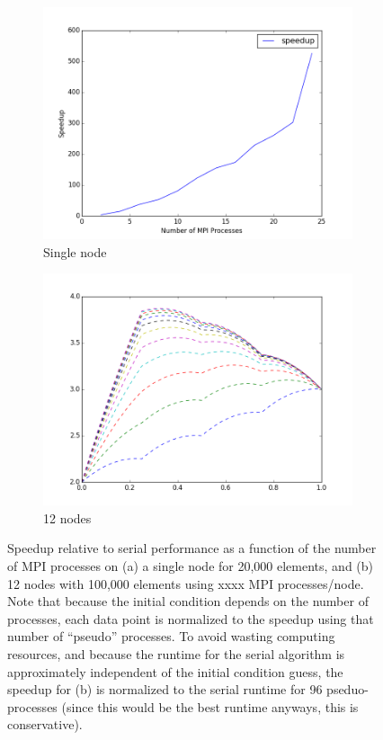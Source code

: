 \documentclass[10pt]{article}
\begin{document}
\begin{figure}[H]
        \centering
        \begin{subfigure}[b]{0.5\textwidth}
                \centering
                \includegraphics[width=\textwidth]{../figures/speedup-mpi.png}
                \caption{Single node}
        \end{subfigure}%
                \begin{subfigure}[b]{0.5\textwidth}
                \centering
                \includegraphics[width=\textwidth]{../figures/interface2.png}
                \caption{12 nodes}
        \end{subfigure}%
\caption{Speedup relative to serial performance as a function of the number of MPI processes on (a) a single node for 20,000 elements, and (b) 12 nodes with 100,000 elements using xxxx MPI processes/node. Note that because the initial condition depends on the number of processes, each data point is normalized to the speedup using that number of ``pseudo'' processes. To avoid wasting computing resources, and because the runtime for the serial algorithm is approximately independent of the initial condition guess, the speedup for (b) is normalized to the serial runtime for 96 pseduo-processes (since this would be the best runtime anyways, this is conservative).}
        \label{fig:speedupMPI}
\end{figure}
\end{document}
